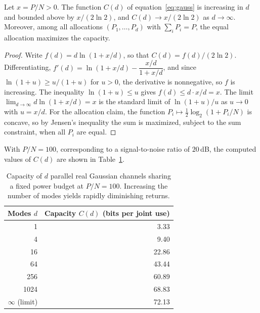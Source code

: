 \begin{proposition}\label{prop:gauss}
Let $x=P/N>0$. The function $C(d)$ of equation~\eqref{eq:gauss} is increasing in $d$ and bounded above by $x/(2\ln 2)$, and $C(d)\to x/(2\ln 2)$ as $d\to\infty$. Moreover, among all allocations $(P_1,\dots,P_d)$ with $\sum_iP_i=P$, the equal allocation maximizes the capacity.
\end{proposition}

\begin{proof}
Write $f(d)=d\ln(1+x/d)$, so that $C(d)=f(d)/(2\ln 2)$. Differentiating, $f'(d)=\ln(1+x/d)-\dfrac{x/d}{1+x/d}$, and since $\ln(1+u)\ge u/(1+u)$ for $u>0$, the derivative is nonnegative, so $f$ is increasing. The inequality $\ln(1+u)\le u$ gives $f(d)\le d\cdot x/d=x$. The limit $\lim_{d\to\infty}d\ln(1+x/d)=x$ is the standard limit of $\ln(1+u)/u$ as $u\to0$ with $u=x/d$. For the allocation claim, the function $P_i\mapsto\tfrac12\log_2(1+P_i/N)$ is concave, so by Jensen's inequality the sum is maximized, subject to the sum constraint, when all $P_i$ are equal.
\end{proof}

With $P/N=100$, corresponding to a signal-to-noise ratio of $20$\,dB, the computed values of $C(d)$ are shown in Table~\ref{tab:gauss}.

\begin{table}[h]
\centering
\small
\begin{tabular}{@{}rr@{}}
\toprule
Modes $d$ & Capacity $C(d)$ (bits per joint use) \\
\midrule
1 & 3.33 \\
4 & 9.40 \\
16 & 22.86 \\
64 & 43.44 \\
256 & 60.89 \\
1024 & 68.83 \\
$\infty$ (limit) & 72.13 \\
\bottomrule
\end{tabular}
\caption{Capacity of $d$ parallel real Gaussian channels sharing a fixed power budget at $P/N=100$. Increasing the number of modes yields rapidly diminishing returns.}
\label{tab:gauss}
\end{table}

